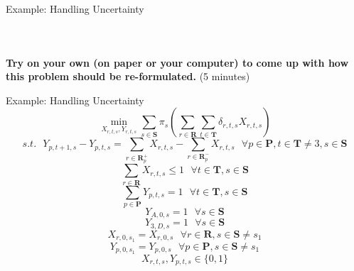 \documentclass[10pt, aspectratio=169]{beamer}
\begin{document}
\begin{frame}{Example: Handling Uncertainty}
\begin{columns}
\begin{column}{0.2\textwidth}
\begin{center}
\begin{tabular}{|c||c|}
                \end{tabular}
            \end{center}

        \end{column}
    \end{columns}
    \begin{center}
        \textbf{Try on your own (on paper or your computer) to come up with how this problem should be re-formulated.} (5 minutes)
    \end{center}
\end{frame}

\begin{frame}{Example: Handling Uncertainty}
    $$\min_{X_{r,t,s},Y_{r,t,s}} \sum_{s \in \textbf{S}} \pi_s \left( \sum_{r \in \textbf{R}} \sum_{t \in \textbf{T}} \delta_{r,t,s} X_{r,t,s}\right)$$
    $$s.t.\ \ \ Y_{p,t+1,s} - Y_{p,t,s} = \sum_{r\in\textbf{R}^+_p} X_{r,t,s} - \sum_{r\in\textbf{R}^-_p} X_{r,t,s} \ \ \ \forall p \in \textbf{P}, t \in \textbf{T} \neq 3, s \in \textbf{S}$$
    $$\sum_{r \in \textbf{R}} X_{r,t,s} \leq 1 \ \ \ \forall t \in \textbf{T}, s \in \textbf{S}$$
    $$\sum_{p \in \textbf{P}} Y_{p,t,s} = 1 \ \ \ \forall t \in \textbf{T}, s \in \textbf{S}$$
    $$Y_{A,0,s} = 1 \ \ \ \forall s \in \textbf{S}$$
    $$Y_{3,D,s} = 1 \ \ \ \forall s \in \textbf{S}$$
    $$X_{r,0,s_1} = X_{r,0,s} \ \ \ \forall r \in \textbf{R}, s \in \textbf{S} \neq s_1$$
    $$Y_{p,0,s_1} = Y_{p,0,s} \ \ \ \forall p \in \textbf{P}, s \in \textbf{S} \neq s_1$$
    $$X_{r,t,s}, Y_{p,t,s} \in \{0,1\}$$
\end{frame}
\end{document}
